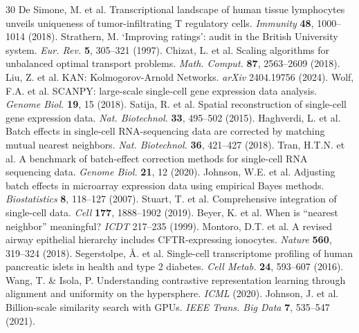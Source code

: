 \documentclass[10pt]{article}
\begin{document}
\begin{thebibliography}{30}
 De Simone, M. et al. Transcriptional landscape of human tissue lymphocytes unveils uniqueness of tumor-infiltrating T regulatory cells. \textit{Immunity} \textbf{48}, 1000--1014 (2018).
 Strathern, M. `Improving ratings': audit in the British University system. \textit{Eur. Rev.} \textbf{5}, 305--321 (1997).
 Chizat, L. et al. Scaling algorithms for unbalanced optimal transport problems. \textit{Math. Comput.} \textbf{87}, 2563--2609 (2018).
 Liu, Z. et al. KAN: Kolmogorov-Arnold Networks. \textit{arXiv} 2404.19756 (2024).
 Wolf, F.A. et al. SCANPY: large-scale single-cell gene expression data analysis. \textit{Genome Biol.} \textbf{19}, 15 (2018).
 Satija, R. et al. Spatial reconstruction of single-cell gene expression data. \textit{Nat. Biotechnol.} \textbf{33}, 495--502 (2015).
 Haghverdi, L. et al. Batch effects in single-cell RNA-sequencing data are corrected by matching mutual nearest neighbors. \textit{Nat. Biotechnol.} \textbf{36}, 421--427 (2018).
 Tran, H.T.N. et al. A benchmark of batch-effect correction methods for single-cell RNA sequencing data. \textit{Genome Biol.} \textbf{21}, 12 (2020).
 Johnson, W.E. et al. Adjusting batch effects in microarray expression data using empirical Bayes methods. \textit{Biostatistics} \textbf{8}, 118--127 (2007).
 Stuart, T. et al. Comprehensive integration of single-cell data. \textit{Cell} \textbf{177}, 1888--1902 (2019).
 Beyer, K. et al. When is ``nearest neighbor'' meaningful? \textit{ICDT} 217--235 (1999).
 Montoro, D.T. et al. A revised airway epithelial hierarchy includes CFTR-expressing ionocytes. \textit{Nature} \textbf{560}, 319--324 (2018).
 Segerstolpe, \r{A}. et al. Single-cell transcriptome profiling of human pancreatic islets in health and type 2 diabetes. \textit{Cell Metab.} \textbf{24}, 593--607 (2016).
 Wang, T. \& Isola, P. Understanding contrastive representation learning through alignment and uniformity on the hypersphere. \textit{ICML} (2020).
 Johnson, J.  et al. Billion-scale similarity search with GPUs. \textit{IEEE Trans. Big Data} \textbf{7}, 535--547 (2021).
\end{thebibliography}

\end{document}

